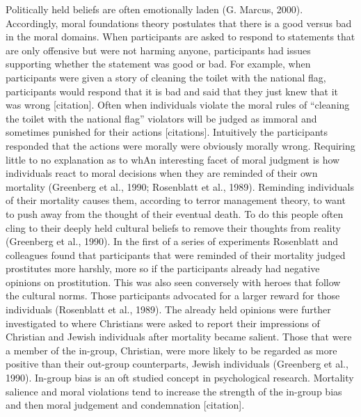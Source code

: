 \documentclass[
  donotrepeattitle,doc, 12pt, a4paper,floatsintext]{apa7}
\begin{document}
Politically held beliefs are often emotionally laden (G. Marcus, 2000). Accordingly, moral foundations theory postulates that there is a good versus bad in the moral domains. When participants are asked to respond to statements that are only offensive but were not harming anyone, participants had issues supporting whether the statement was good or bad. For example, when participants were given a story of cleaning the toilet with the national flag, participants would respond that it is bad and said that they just knew that it was wrong {[}citation{]}. Often when individuals violate the moral rules of ``cleaning the toilet with the national flag'' violators will be judged as immoral and sometimes punished for their actions {[}citations{]}. Intuitively the participants responded that the actions were morally were obviously morally wrong. Requiring little to no explanation as to whAn interesting facet of moral judgment is how individuals react to moral decisions when they are reminded of their own mortality (Greenberg et al., 1990; Rosenblatt et al., 1989). Reminding individuals of their mortality causes them, according to terror management theory, to want to push away from the thought of their eventual death. To do this people often cling to their deeply held cultural beliefs to remove their thoughts from reality (Greenberg et al., 1990). In the first of a series of experiments Rosenblatt and colleagues found that participants that were reminded of their mortality judged prostitutes more harshly, more so if the participants already had negative opinions on prostitution. This was also seen conversely with heroes that follow the cultural norms. Those participants advocated for a larger reward for those individuals (Rosenblatt et al., 1989). The already held opinions were further investigated to where Christians were asked to report their impressions of Christian and Jewish individuals after mortality became salient. Those that were a member of the in-group, Christian, were more likely to be regarded as more positive than their out-group counterparts, Jewish individuals (Greenberg et al., 1990). In-group bias is an oft studied concept in psychological research. Mortality salience and moral violations tend to increase the strength of the in-group bias and then moral judgement and condemnation {[}citation{]}.
\end{document}
